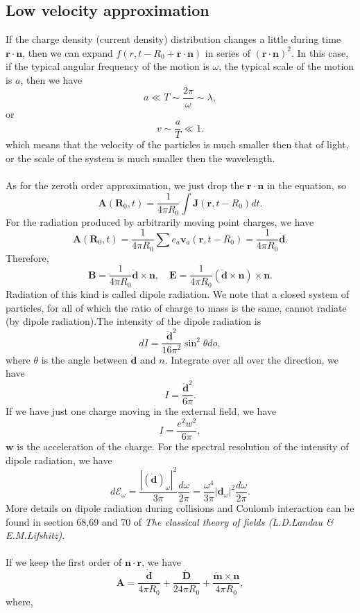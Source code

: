 \subsection{Low velocity approximation}
If the charge density (current density) distribution changes a little during time $\bm{r}\cdot\bm{n}$, then we can expand $f(r,t-R_0+\bm{r}\cdot\bm{n})$ in series of $(\bm{r}\cdot\bm{n})^2$. In this case, if the typical angular frequency of the motion is $\omega$, the typical scale of the motion is $a$, then we have
\[a \ll T \sim \frac{2\pi}{\omega} \sim \lambda,\]
or
\[v \sim \frac{a}{T} \ll 1.\]
which means that the velocity of the particles is much smaller then that of light, or the scale of the system is much smaller then the wavelength.
\\ \\
As for the zeroth order approximation, we just drop the $\bm{r}\cdot\bm{n}$ in the equation, so
\[\bm{A}(\bm{R}_0,t) = \frac{1}{4\pi R_0} \int \bm{J}(\bm{r},t-R_0) dt.\]
For the radiation produced by arbitrarily moving point charges, we have
\[\bm{A}(\bm{R}_0,t) = \frac{1}{4\pi R_0} \sum e_a \bm{v}_a(\bm{r},t-R_0) = \frac{1}{4\pi R_0} \dot{\bm{d}}.\]
Therefore,
\[\bm{B} = \frac{1}{4\pi R_0} \ddot{\bm{d}} \times \bm{n} , \quad \bm{E} = \frac{1}{4\pi R_0} (\ddot{\bm{d}} \times \bm{n})\times \bm{n}.\]
Radiation of this kind is called dipole radiation. 
We note that a closed system of particles, for all of which the ratio of charge to mass is the same, cannot radiate (by dipole radiation).The intensity of the dipole radiation is
\[dI = \frac{\ddot{\bm{d}}^2}{16\pi^2} \sin^2\theta do,\]
where $\theta$ is the angle between $\ddot{\bm{d}}$ and $n$.
Integrate over all over the direction, we have
\[I = \frac{\ddot{\bm{d}}^2}{6\pi}.\]
If we have just one charge moving in the external field, we have
\[I = \frac{e^2 w^2}{6\pi},\]
$\bm{w}$ is the acceleration of the charge.
For the spectral resolution of the intensity of dipole radiation, we have
\[d\mathcal{E}_{\omega} = \frac{|(\ddot{\bm{d}})_{\omega}|^2}{3\pi}\frac{d\omega}{2\pi} = \frac{\omega^4}{3\pi}|\bm{d}_{\omega}|^2 \frac{d\omega}{2\pi}.\]
More details on dipole radiation during collisions and Coulomb interaction can be found in section 68,69 and 70 of \emph{The classical theory of fields (L.D.Landau \& E.M.Lifshitz)}.
\\ \\
If we keep the first order of $\bm{n}\cdot\bm{r}$, we have
\[\bm{A} = \frac{\dot{\bm{d}}}{4\pi R_0} + \frac{\ddot{\bm{D}}}{24\pi R_0} + \frac{\dot{\bm{m}}\times \bm{n}}{4\pi R_0},\]
where,
